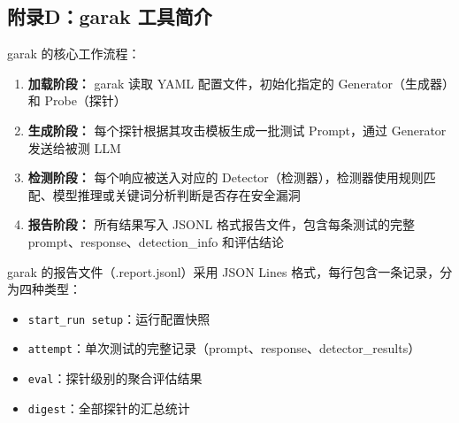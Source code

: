 \documentclass[UTF8]{ctexart}
\begin{document}
\subsection{附录D：garak 工具简介}

garak 的核心工作流程：

\begin{enumerate}[label=(\arabic*)]
    \item \textbf{加载阶段：} garak 读取 YAML 配置文件，初始化指定的 Generator（生成器）和 Probe（探针）
    \item \textbf{生成阶段：} 每个探针根据其攻击模板生成一批测试 Prompt，通过 Generator 发送给被测 LLM
    \item \textbf{检测阶段：} 每个响应被送入对应的 Detector（检测器），检测器使用规则匹配、模型推理或关键词分析判断是否存在安全漏洞
    \item \textbf{报告阶段：} 所有结果写入 JSONL 格式报告文件，包含每条测试的完整 prompt、response、detection\_info 和评估结论
\end{enumerate}

garak 的报告文件（.report.jsonl）采用 JSON Lines 格式，每行包含一条记录，分为四种类型：
\begin{itemize}
    \item \texttt{start\_run setup}：运行配置快照
    \item \texttt{attempt}：单次测试的完整记录（prompt、response、detector\_results）
    \item \texttt{eval}：探针级别的聚合评估结果
    \item \texttt{digest}：全部探针的汇总统计
\end{itemize}

\vspace{1cm}
\end{document}
